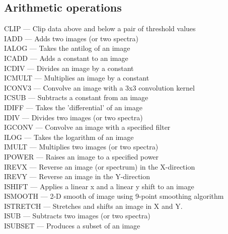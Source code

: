 \documentclass[11pt,twoside]{article}
\newcommand{\htmlref}[2]{#1}
\begin{document}

\subsection{\label{classifarith}Arithmetic operations}

\htmlref{CLIP}{CLIP} --- Clip data above and below a pair of threshold values\\
\htmlref{IADD}{IADD} --- Adds two images (or two spectra)\\
\htmlref{IALOG}{IALOG} --- Takes the antilog of an image\\
\htmlref{ICADD}{ICADD} --- Adds a constant to an image\\
\htmlref{ICDIV}{ICDIV} --- Divides an image by a constant\\
\htmlref{ICMULT}{ICMULT} --- Multiplies an image by a constant\\
\htmlref{ICONV3}{ICONV3} --- Convolve an image with a 3x3 convolution kernel\\
\htmlref{ICSUB}{ICSUB} --- Subtracts a constant from an image\\
\htmlref{IDIFF}{IDIFF} --- Takes the 'differential' of an image\\
\htmlref{IDIV}{IDIV} --- Divides two images (or two spectra)\\
\htmlref{IGCONV}{IGCONV} --- Convolve an image with a specified filter\\
\htmlref{ILOG}{ILOG} --- Takes the logarithm of an image\\
\htmlref{IMULT}{IMULT} --- Multiplies two images (or two spectra)\\
\htmlref{IPOWER}{IPOWER} --- Raises an image to a specified power\\
\htmlref{IREVX}{IREVX} --- Reverse an image (or spectrum) in the X-direction\\
\htmlref{IREVY}{IREVY} --- Reverse an image in the Y-direction\\
\htmlref{ISHIFT}{ISHIFT} --- Applies a linear x and a linear y shift to an image\\
\htmlref{ISMOOTH}{ISMOOTH} --- 2-D smooth of image using 9-point smoothing algorithm\\
\htmlref{ISTRETCH}{ISTRETCH} --- Stretches and shifts an image in X and Y.\\
\htmlref{ISUB}{ISUB} --- Subtracts two images (or two spectra)\\
\htmlref{ISUBSET}{ISUBSET} --- Produces a subset of an image\\
\end{document}
